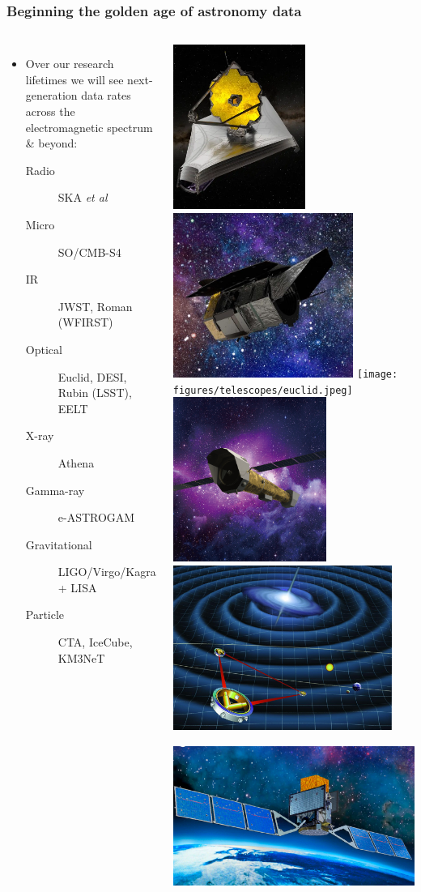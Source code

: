 \documentclass[aspectratio=169]{beamer}
\begin{document}
\begin{frame}
    \frametitle{Beginning the golden age of astronomy data}
    \begin{columns}
        \begin{itemize}
            \item Over our research lifetimes we will see next-generation data rates across the electromagnetic spectrum \& beyond:
                \begin{description}
                    \item[Radio] SKA \textit{et al}
                    \item[Micro] SO/CMB-S4
                    \item[IR] JWST, Roman (WFIRST)
                    \item[Optical] Euclid, DESI, Rubin (LSST), EELT
                    \item[X-ray] Athena
                    \item[Gamma-ray] e-ASTROGAM
                    \item[Gravitational] LIGO/Virgo/Kagra + LISA
                    \item[Particle] CTA, IceCube, KM3NeT
                \end{description}
        \end{itemize}

        \includegraphics[height=0.145\textwidth]{figures/telescopes/jwst.png}%
        \includegraphics[height=0.145\textwidth]{figures/telescopes/roman.jpg}%
        \texttt{[image: figures/telescopes/euclid.jpeg]}%
        \includegraphics[height=0.145\textwidth]{figures/telescopes/athena.jpg}%
        \includegraphics[height=0.145\textwidth]{figures/telescopes/lisa.jpg}%
        \includegraphics[height=0.145\textwidth]{figures/telescopes/e-ASTROGAM.pdf}%
        \vspace{-1pt}


\end{columns}
\end{frame}
\end{document}
